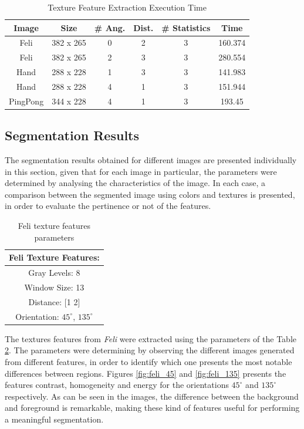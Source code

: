 \documentclass{IEEEtran}
\begin{document}
\begin{table}[h!]
\centering
\begin{tabular}{|c|c|c|c|c|c|}
\hline
Image & Size &\# Ang. & Dist. & \# Statistics & Time \\  
\hline
Feli & 382 x 265 & 0 & 2 & 3 & 160.374 \\
\hline
Feli & 382 x 265  & 2 & 3 & 3 & 280.554 \\
\hline
Hand & 288 x 228 & 1 & 3 & 3 & 141.983 \\
\hline
Hand & 288 x 228 & 4 & 1 & 3 & 151.944\\
\hline
PingPong & 344 x 228 & 4 & 1 & 3 & 193.45 \\
\hline
\end{tabular}
\caption{Texture Feature Extraction Execution Time}
\label{tb:performance}
\end{table} 

\subsection{Segmentation Results}

The segmentation results obtained for different images are presented individually in this section, given that for each image in particular, the parameters were determined by analysing the characteristics of the image. In each case, a comparison between the segmented image using colors and textures is presented, in order to evaluate the pertinence or not of the features.\\

\begin{table}[h!] 
\centering
\begin{tabular}{|c|}
\hline
Feli Texture Features:\\
\hline
  Gray Levels:   8\\
  Window Size: 13\\
  Distance:   [1 2]\\
  Orientation:  $45^{\circ}$, $135^{\circ}$\\
\hline
\end{tabular}
\caption{Feli texture features parameters}
\label{tb:param_feli}
\end{table}

The textures features from \textit{Feli} were extracted using the parameters of the Table \ref{tb:param_feli}. The parameters were determining by observing the different images generated from different features, in order to identify which one presents the most notable differences between regions. Figures \ref{fig:feli_45} and \ref{fig:feli_135} presents the features contrast, homogeneity and energy for the orientations $45^{\circ}$ and $135^{\circ}$ respectively. As can be seen in the images, the difference between the background and foreground is remarkable, making these kind of features useful for performing a meaningful segmentation.\\
\end{document}

